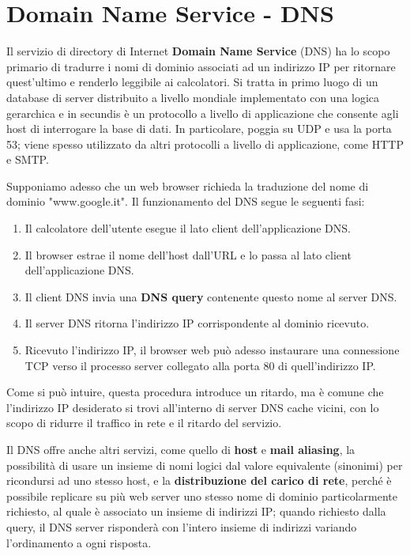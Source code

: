 \section{Domain Name Service - DNS}
Il servizio di directory di Internet \textbf{Domain Name Service} (DNS) ha lo scopo primario di tradurre i nomi di dominio associati ad un indirizzo IP per ritornare quest'ultimo e renderlo leggibile ai calcolatori. Si tratta in primo luogo di un database di server distribuito a livello mondiale implementato con una logica gerarchica e in secundis è un protocollo a livello di applicazione che consente agli host di interrogare la base di dati. In particolare, poggia su UDP e usa la porta 53; viene spesso utilizzato da altri protocolli a livello di applicazione, come HTTP e SMTP.\par
Supponiamo adesso che un web browser richieda la traduzione del nome di dominio "www.google.it". Il funzionamento del DNS segue le seguenti fasi: \begin{enumerate}
	\item Il calcolatore dell'utente esegue il lato client dell'applicazione DNS.
	\item Il browser estrae il nome dell'host dall'URL e lo passa al lato client dell'applicazione DNS.
	\item Il client DNS invia una \textbf{DNS query} contenente questo nome al server DNS.
	\item Il server DNS ritorna l'indirizzo IP corrispondente al dominio ricevuto.
	\item Ricevuto l'indirizzo IP, il browser web può adesso instaurare una connessione TCP verso il processo server collegato alla porta 80 di quell'indirizzo IP.
\end{enumerate}
\noindent Come si può intuire, questa procedura introduce un ritardo, ma è comune che l'indirizzo IP desiderato si trovi all'interno di server DNS cache vicini, con lo scopo di ridurre il traffico in rete e il ritardo del servizio.\par
Il DNS offre anche altri servizi, come quello di \textbf{host} e \textbf{mail aliasing}, la possibilità di usare un insieme di nomi logici dal valore equivalente (sinonimi) per ricondursi ad uno stesso host, e la \textbf{distribuzione del carico di rete}, perché è possibile replicare su più web server uno stesso nome di dominio particolarmente richiesto, al quale è associato un insieme di indirizzi IP; quando richiesto dalla query, il DNS server risponderà con l'intero insieme di indirizzi variando l'ordinamento a ogni risposta.\newline

